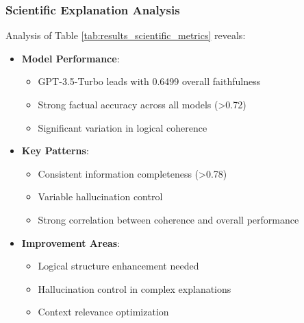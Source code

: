 \subsubsection{Scientific Explanation Analysis}
Analysis of Table \ref{tab:results_scientific_metrics} reveals:
\begin{itemize}
    \item \textbf{Model Performance}:
    \begin{itemize}
        \item GPT-3.5-Turbo leads with 0.6499 overall faithfulness
        \item Strong factual accuracy across all models (>0.72)
        \item Significant variation in logical coherence
    \end{itemize}
    \item \textbf{Key Patterns}:
    \begin{itemize}
        \item Consistent information completeness (>0.78)
        \item Variable hallucination control
        \item Strong correlation between coherence and overall performance
    \end{itemize}
    \item \textbf{Improvement Areas}:
    \begin{itemize}
        \item Logical structure enhancement needed
        \item Hallucination control in complex explanations
        \item Context relevance optimization
    \end{itemize}
\end{itemize}

